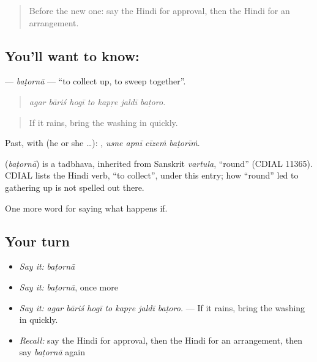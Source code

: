 \label{lesson:HI-C395-batorna}



\begin{quote}
Before the new one: say the Hindi for approval, then the Hindi for an arrangement.
\end{quote}

\subsection*{You'll want to know: }
\textbf{} — \emph{baṭornā} — \textquotedblleft{}to collect up, to sweep together\textquotedblright{}.

\begin{quote}
      
\end{quote}

\begin{quote}
\emph{agar bāriś hogī to kapṛe jaldī baṭoro.}
\end{quote}

\begin{quote}
If it rains, bring the washing in quickly.
\end{quote}

Past, with  (he or she …):    , \emph{usne apnī cīzeṁ baṭorīṁ}.

\begin{cousinweb}
\textbf{} (\emph{baṭornā}) is a tadbhava, inherited from Sanskrit \emph{vartula}, \textquotedblleft{}round\textquotedblright{} (CDIAL 11365). CDIAL lists the Hindi verb, \textquotedblleft{}to collect\textquotedblright{}, under this entry; how \textquotedblleft{}round\textquotedblright{} led to gathering up is not spelled out there.
\end{cousinweb}

\begin{grammarlens}[title={What you've built}]
One more word for saying what happens if.
\end{grammarlens}

\subsection*{Your turn}
\begin{itemize}
\raggedright
  \item \emph{Say it:} \emph{baṭornā}
  \item \emph{Say it:} \emph{baṭornā}, once more
  \item \emph{Say it:} \emph{agar bāriś hogī to kapṛe jaldī baṭoro.} — If it rains, bring the washing in quickly.
  \item \emph{Recall:} say the Hindi for approval, then the Hindi for an arrangement, then say \emph{baṭornā} again
\end{itemize}

